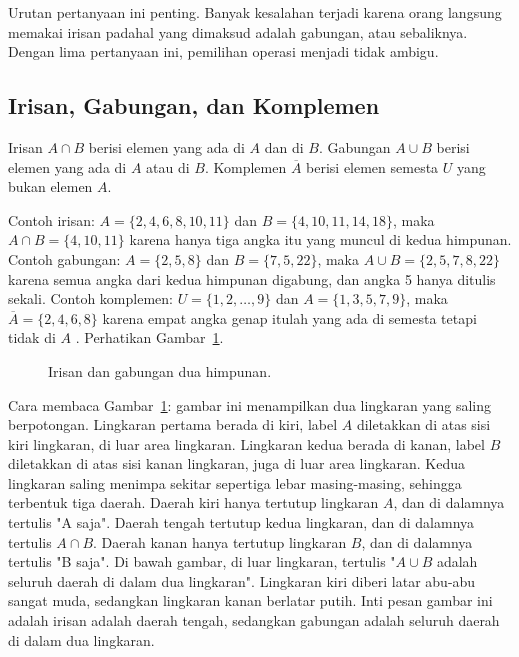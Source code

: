 \documentclass[11pt,a4paper]{article}
\begin{document}
Urutan pertanyaan ini penting. Banyak kesalahan terjadi karena orang langsung memakai irisan padahal yang dimaksud adalah gabungan, atau sebaliknya. Dengan lima pertanyaan ini, pemilihan operasi menjadi tidak ambigu.

\subsection{Irisan, Gabungan, dan Komplemen}

Irisan $A \cap B$ berisi elemen yang ada di $A$ dan di $B$. Gabungan $A \cup B$ berisi elemen yang ada di $A$ atau di $B$. Komplemen $\overline{A}$ berisi elemen semesta $U$ yang bukan elemen $A$.

Contoh irisan: $A=\{2,4,6,8,10,11\}$ dan $B=\{4,10,11,14,18\}$, maka $A \cap B=\{4,10,11\}$ karena hanya tiga angka itu yang muncul di kedua himpunan. Contoh gabungan: $A=\{2,5,8\}$ dan $B=\{7,5,22\}$, maka $A \cup B=\{2,5,7,8,22\}$ karena semua angka dari kedua himpunan digabung, dan angka 5 hanya ditulis sekali. Contoh komplemen: $U=\{1,2,\ldots,9\}$ dan $A=\{1,3,5,7,9\}$, maka $\overline{A}=\{2,4,6,8\}$ karena empat angka genap itulah yang ada di semesta tetapi tidak di $A$ \cite{munir}. Perhatikan Gambar~\ref{fig:irisan-gabungan}.

\begin{figure}[H]
	\centering
	\caption{Irisan dan gabungan dua himpunan.}
	\label{fig:irisan-gabungan}
\end{figure}

Cara membaca Gambar~\ref{fig:irisan-gabungan}: gambar ini menampilkan dua lingkaran yang saling berpotongan. Lingkaran pertama berada di kiri, label $A$ diletakkan di atas sisi kiri lingkaran, di luar area lingkaran. Lingkaran kedua berada di kanan, label $B$ diletakkan di atas sisi kanan lingkaran, juga di luar area lingkaran. Kedua lingkaran saling menimpa sekitar sepertiga lebar masing-masing, sehingga terbentuk tiga daerah. Daerah kiri hanya tertutup lingkaran $A$, dan di dalamnya tertulis "A saja". Daerah tengah tertutup kedua lingkaran, dan di dalamnya tertulis $A \cap B$. Daerah kanan hanya tertutup lingkaran $B$, dan di dalamnya tertulis "B saja". Di bawah gambar, di luar lingkaran, tertulis "$A \cup B$ adalah seluruh daerah di dalam dua lingkaran". Lingkaran kiri diberi latar abu-abu sangat muda, sedangkan lingkaran kanan berlatar putih. Inti pesan gambar ini adalah irisan adalah daerah tengah, sedangkan gabungan adalah seluruh daerah di dalam dua lingkaran.
\end{document}
